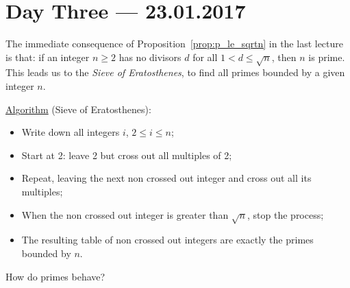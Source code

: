 \documentclass{amsbook}
\theoremstyle{plain}
\theoremstyle{definition}
\theoremstyle{remark}
\numberwithin{equation}{chapter}
\numberwithin{figure}{chapter}
\begin{document}
\chapter[Lecture Three]{Day Three \hfill {\footnotesize \rm --- 23.01.2017}}

The immediate consequence of Proposition~\ref{prop:p_le_sqrtn} in the last lecture is that: if an integer $n \geqslant 2$ has no divisors $d$ for all $1 < d \leqslant \sqrt n$, then $n$ is prime. This leads us to the \emph{Sieve of Eratosthenes}, to find all primes bounded by a given integer $n$.

\underline{Al}g\underline{orithm} (Sieve of Eratosthenes): 
\begin{itemize} 
\item Write down all integers $i$, $2 \leqslant i \leqslant n$; 
\item Start at 2: leave 2 but cross out all multiples of 2;
\item Repeat, leaving the next non crossed out integer and cross out all its multiples;
\item When the non crossed out integer is greater than $\sqrt n$, stop the process;
\item The resulting table of non crossed out integers are exactly the primes bounded by $n$.
\end{itemize}

How do primes behave?
\end{document}
